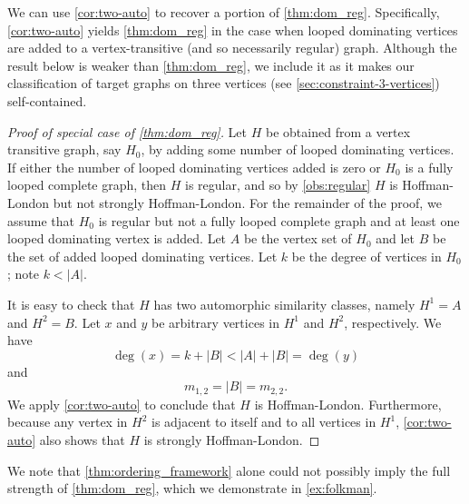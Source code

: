 \documentclass[11pt]{article}
\theoremstyle{definition}
\begin{document}
We can use \cref{cor:two-auto} to recover a portion of \cref{thm:dom_reg}. Specifically, \cref{cor:two-auto} yields \cref{thm:dom_reg} in the case when looped dominating vertices are added to a vertex-transitive (and so necessarily regular) graph. Although the result below is weaker than \cref{thm:dom_reg}, we include it as it makes our classification of target graphs on three vertices (see \cref{sec:constraint-3-vertices}) self-contained. 

\begin{proof}[Proof of special case of \cref{thm:dom_reg}]
Let $H$ be obtained from a vertex transitive graph, say $H_0$, by adding some number of looped dominating vertices. If either the number of looped dominating vertices added is zero or $H_0$ is a fully looped complete graph, then $H$ is regular, and so by \cref{obs:regular} $H$ is Hoffman-London but not strongly Hoffman-London. For the remainder of the proof, we assume that $H_0$ is regular but not a fully looped complete graph and at least one looped dominating vertex is added. Let $A$ be the vertex set of $H_0$ and let $B$ be the set of added looped dominating vertices. Let $k$ be the degree of vertices in $H_0$; note $k < |A|$.     

It is easy to check that $H$ has two automorphic similarity classes, namely $H^1=A$ and $H^2=B$. 
Let $x$ and $y$ be arbitrary vertices in $H^1$ and $H^2$, respectively. We have 
\[
\deg(x) = k + |B| < |A| + |B| = \deg(y)
\]
and 
\[
m_{1,2} = |B| = m_{2,2}. 
\]
We apply \cref{cor:two-auto} to conclude that $H$ is Hoffman-London. Furthermore, because any vertex in $H^2$ is adjacent to itself and to all vertices in $H^1$, \cref{cor:two-auto} also shows that $H$ is strongly Hoffman-London.
\end{proof}

We note that \cref{thm:ordering_framework} alone could not possibly imply the full strength of \cref{thm:dom_reg}, which we demonstrate in \cref{ex:folkman}.
\end{document}
